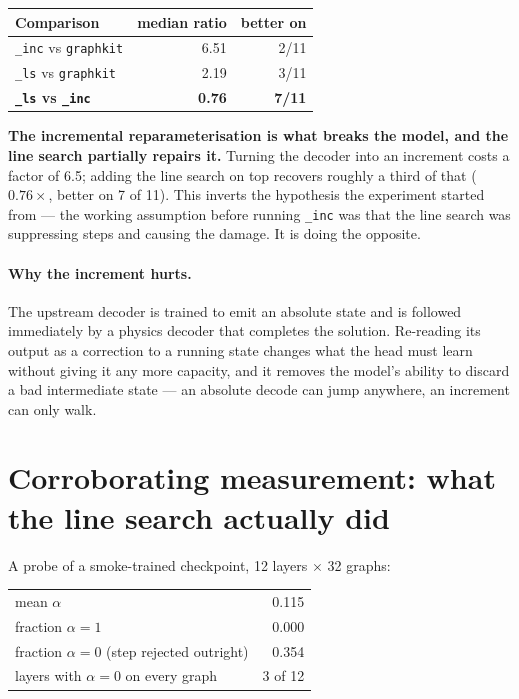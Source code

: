 \documentclass[10pt]{article}
\begin{document}
\begin{table}[H]
\centering\small
\begin{tabular}{lrr}
\toprule
Comparison & median ratio & better on \\
\midrule
\texttt{\_inc} vs \texttt{graphkit} & 6.51 & 2/11 \\
\texttt{\_ls} vs \texttt{graphkit}  & 2.19 & 3/11 \\
\textbf{\texttt{\_ls} vs \texttt{\_inc}} & \textbf{0.76} & \textbf{7/11} \\
\bottomrule
\end{tabular}
\end{table}

\textbf{The incremental reparameterisation is what breaks the model, and the line
search partially repairs it.} Turning the decoder into an increment costs a
factor of 6.5; adding the line search on top recovers roughly a third of that
($0.76\times$, better on 7 of 11). This inverts the hypothesis the experiment
started from --- the working assumption before running \texttt{\_inc} was that
the line search was suppressing steps and causing the damage. It is doing the
opposite.

\paragraph{Why the increment hurts.} The upstream decoder is trained to emit an
absolute state and is followed immediately by a physics decoder that completes
the solution. Re-reading its output as a correction to a running state changes
what the head must learn without giving it any more capacity, and it removes the
model's ability to discard a bad intermediate state --- an absolute decode can
jump anywhere, an increment can only walk.

\section{Corroborating measurement: what the line search actually did}

A probe of a smoke-trained checkpoint, 12 layers $\times$ 32 graphs:

\begin{table}[H]
\centering\small
\begin{tabular}{lr}
\toprule
mean $\alpha$ & 0.115 \\
fraction $\alpha = 1$ & 0.000 \\
fraction $\alpha = 0$ (step rejected outright) & 0.354 \\
layers with $\alpha = 0$ on every graph & 3 of 12 \\
\bottomrule
\end{tabular}
\end{table}
\end{document}
